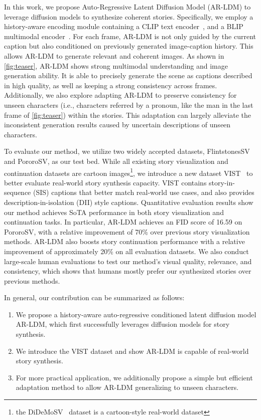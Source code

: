\documentclass[10pt,twocolumn,letterpaper]{article}
\begin{document}
In this work, we propose Auto-Regressive Latent Diffusion Model (AR-LDM) to leverage diffusion models to synthesize coherent stories. Specifically, we employ a history-aware encoding module containing a CLIP text encoder~\cite{clip}, and a BLIP multimodal encoder~\cite{blip}. For each frame, AR-LDM is not only guided by the current caption but also conditioned on previously generated image-caption history. This allows AR-LDM to generate relevant and coherent images. As shown in \cref{fig:teaser}, AR-LDM shows strong multimodal understanding and image generation ability. It is able to precisely generate the scene as captions described in high quality, as well as keeping a strong consistency across frames. Additionally, we also explore adapting AR-LDM to preserve consistency for unseen characters (i.e., characters referred by a pronoun, like the man in the last frame of \cref{fig:teaser}) within the stories. This adaptation can largely alleviate the inconsistent generation results caused by uncertain descriptions of unseen characters.

To evaluate our method, we utilize two widely accepted datasets, FlintstonesSV and PororoSV, as our test bed. While all existing story visualization and continuation datasets are cartoon images\footnote{the DiDeMoSV~\cite{storydalle} dataset is a cartoon-style real-world dataset}, we introduce a new dataset VIST~\cite{vist} to better evaluate real-world story synthesis capacity. VIST contains story-in-sequence (SIS) captions that better match real-world use cases, and also provides description-in-isolation (DII) style captions. Quantitative evaluation results show our method achieves SoTA performance in both story visualization and continuation tasks. In particular, AR-LDM achieves an FID score of 16.59 on PororoSV, with a relative improvement of 70\% over previous story visualization methods. AR-LDM also boosts story continuation performance with a relative improvement of approximately 20\% on all evaluation datasets. We also conduct large-scale human evaluations to test our method's visual quality, relevance, and consistency, which shows that humans mostly prefer our synthesized stories over previous methods.


In general, our contribution can be summarized as follows:
\begin{enumerate}
    \item We propose a history-aware auto-regressive conditioned latent diffusion model AR-LDM, which first successfully leverages diffusion models for story synthesis.
    \item We introduce the VIST dataset and show AR-LDM is capable of real-world story synthesis.
    \item For more practical application, we additionally propose a simple but efficient adaptation method to allow AR-LDM generalizing to unseen characters.
\end{enumerate}
\end{document}

